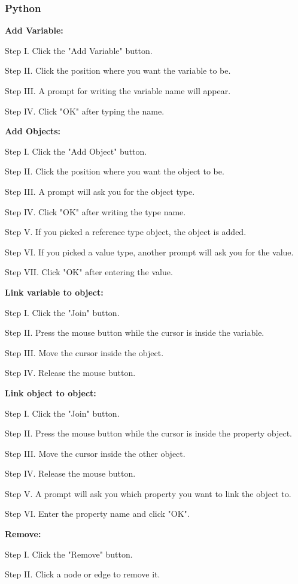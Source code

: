 \subsubsection{Python}

\textbf{Add Variable:}
\begin{userManualItemlist}
    \item[Step I.] Click the "Add Variable" button.
    \item[Step II.] Click the position where you want the variable to be.
    \item[Step III.] A prompt for writing the variable name will appear.
    \item[Step IV.] Click "OK" after typing the name.
\end{userManualItemlist}

\textbf{Add Objects:}
\begin{userManualItemlist}
    \item[Step I.] Click the "Add Object" button.
    \item[Step II.] Click the position where you want the object to be.
    \item[Step III.] A prompt will ask you for the object type.
    \item[Step IV.] Click "OK" after writing the type name. 
    \item[Step V.] If you picked a reference type object, the object is added. 
    \item[Step VI.] If you picked a value type, another prompt will ask you for the value.
    \item[Step VII.] Click "OK" after entering the value.
\end{userManualItemlist}


\textbf{Link variable to object:}
\begin{userManualItemlist}
    \item[Step I.] Click the "Join" button.
    \item[Step II.] Press the mouse button while the cursor is inside the variable.
    \item[Step III.] Move the cursor inside the object.
    \item[Step IV.] Release the mouse button.  
\end{userManualItemlist}

\textbf{Link object to object:}
\begin{userManualItemlist}
    \item[Step I.] Click the "Join" button.
    \item[Step II.] Press the mouse button while the cursor is inside the property object.
    \item[Step III.] Move the cursor inside the other object.
    \item[Step IV.] Release the mouse button.
    \item[Step V.] A prompt will ask you which property you want to link the object to.
    \item[Step VI.] Enter the property name and click "OK".  
\end{userManualItemlist}

\textbf{Remove:}
\begin{userManualItemlist}
    \item[Step I.] Click the "Remove" button.
    \item[Step II.] Click a node or edge to remove it.  
\end{userManualItemlist}